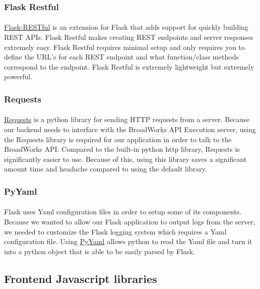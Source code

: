 \documentclass[12pt]{article}
\begin{document}
\subsubsection{Flask Restful}	
\paragraph{}
	\href{https://flask-restful.readthedocs.io/en/latest/}{Flask-RESTful} is an extension for Flask that adds support for quickly building REST APIs. Flask Restful makes creating REST endpoints and server responses extremely easy. Flask Restful requires minimal setup and only requires you to define the URL's for each REST endpoint and what function/class methods correspond to the endpoint. Flask Restful is extremely lightweight but extremely powerful.
	
\subsubsection{Requests}	
\paragraph{}
	\href{http://docs.python-requests.org/en/master/}{Requests} is a python library for sending HTTP requests from a server. Because our backend needs to interface with the BroadWorks API Execution server, using the Requests library is required for our application in order to talk to the BroadWorks API. Compared to the built-in python http library, Requests is significantly easier to use. Because of this, using this library saves a significant amount time and headache compared to using the default library.
	
\subsubsection{PyYaml}	
\paragraph{}
	Flask uses Yaml configuration files in order to setup some of its components. Because we wanted to allow our Flask application to output logs from the server, we needed to customize the Flask logging system which requires a Yaml configuration file. Using \href{https://pyyaml.org/wiki/PyYAMLDocumentation}{PyYaml} allows python to read the Yaml file and turn it into a python object that is able to be easily parsed by Flask.

\subsection{Frontend Javascript libraries}
\end{document}
